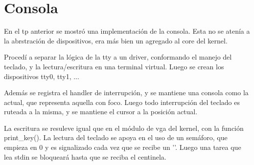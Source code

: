 \section{Consola}

En el tp anterior se mostró una implementación de la consola. Esta no se atenía
a la abrstración de dispositivos, era más bien un agregado al core del kernel.

Procedí a separar la lógica de la tty a un driver, conformando el manejo del
teclado, y la lectura/escritura en una terminal virtual. Luego se crean los
dispositivos tty0, tty1, ...

Además se registra el handler de interrupción, y se mantiene una consola como
la actual, que representa aquella con foco. Luego todo interrupción del
teclado es ruteada a la misma, y se mantiene el cursor a la posición actual.

La escritura se resuleve igual que en el módulo de vga del kernel, con la
función print\_key(). La lectura del teclado se apoya en el uso de un semáforo,
que empieza en 0 y es signalizado cada vez que se recibe un '\n'. Luego una
tarea que lea stdin se bloqueará hasta que se reciba el centinela.
